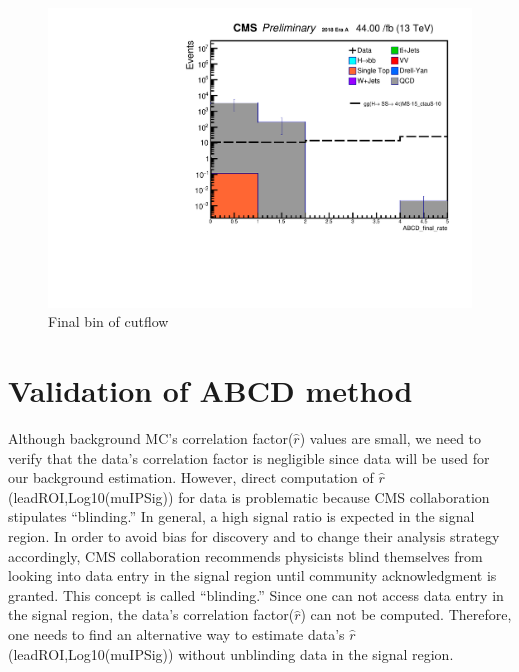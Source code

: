  \begin{figure}[h!]
   \caption{Final bin of cutflow}
   \label{fig:Finalbin}
   \centering
   \includegraphics[width=0.67\linewidth]{figs/log_CutflAnalysisNote_MS-15_ctauS-10_ABCD_final_rate.pdf}
 \end{figure}

\section{Validation of ABCD method}
Although background MC's correlation factor($\hat{r}$) values are small, we need to verify that the data's correlation factor is negligible since data will be used for our background estimation.
However, direct computation of $\hat{r}$(leadROI,Log10(muIPSig)) for data is problematic because CMS collaboration stipulates ``blinding.''
In general, a high signal ratio is expected in the signal region.
In order to avoid bias for discovery and to change their analysis strategy accordingly, CMS collaboration recommends physicists blind themselves from looking into data entry in the signal region until community acknowledgment is granted.
This concept is called ``blinding.''
Since one can not access data entry in the signal region, the data's correlation factor($\hat{r}$) can not be computed.
Therefore, one needs to find an alternative way to estimate data's $\hat{r}$(leadROI,Log10(muIPSig)) without unblinding data in the signal region.

